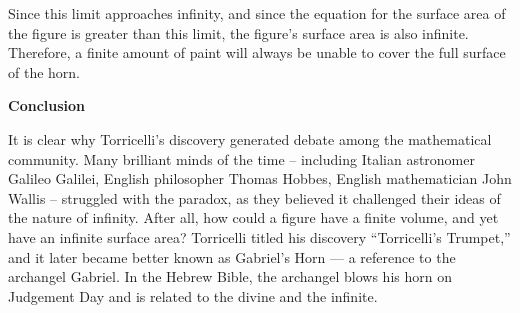 Since this limit approaches infinity, and since the equation for the surface area of the figure is greater than this limit, the figure’s surface area is also infinite. Therefore, a finite amount of paint will always be unable to cover the full surface of the horn.

\noindent
\textbf{Conclusion}
	
	It is clear why Torricelli’s discovery generated debate among the mathematical community. Many brilliant minds of the time – including Italian astronomer Galileo Galilei, English philosopher Thomas Hobbes, English mathematician John Wallis – struggled with the paradox, as they believed it challenged their ideas of the nature of infinity. After all, how could a figure have a finite volume, and yet have an infinite surface area? Torricelli titled his discovery “Torricelli’s Trumpet,” and it later became better known as Gabriel’s Horn — a reference to the archangel Gabriel. In the Hebrew Bible, the archangel blows his horn on Judgement Day and is related to the divine and the infinite.